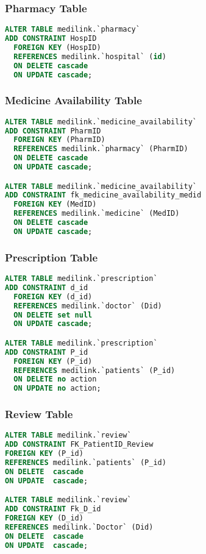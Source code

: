 \documentclass[11pt]{article}
\begin{document}
\subsubsection{Pharmacy Table}
\begin{lstlisting}[language=SQL]
ALTER TABLE medilink.`pharmacy` 
ADD CONSTRAINT HospID
  FOREIGN KEY (HospID)
  REFERENCES medilink.`hospital` (id)
  ON DELETE cascade
  ON UPDATE cascade;
\end{lstlisting}

\subsubsection{Medicine Availability Table}
\begin{lstlisting}[language=SQL]
ALTER TABLE medilink.`medicine_availability` 
ADD CONSTRAINT PharmID
  FOREIGN KEY (PharmID)
  REFERENCES medilink.`pharmacy` (PharmID)
  ON DELETE cascade
  ON UPDATE cascade;

ALTER TABLE medilink.`medicine_availability`
ADD CONSTRAINT fk_medicine_availability_medid
  FOREIGN KEY (MedID)
  REFERENCES medilink.`medicine` (MedID)
  ON DELETE cascade
  ON UPDATE cascade;
\end{lstlisting}

\subsubsection{Prescription Table}
\begin{lstlisting}[language=SQL]
ALTER TABLE medilink.`prescription` 
ADD CONSTRAINT d_id
  FOREIGN KEY (d_id)
  REFERENCES medilink.`doctor` (Did)
  ON DELETE set null
  ON UPDATE cascade;

ALTER TABLE medilink.`prescription` 
ADD CONSTRAINT P_id
  FOREIGN KEY (P_id)
  REFERENCES medilink.`patients` (P_id)
  ON DELETE no action
  ON UPDATE no action;
\end{lstlisting}

\subsubsection{Review Table}
\begin{lstlisting}[language=SQL]
ALTER TABLE medilink.`review`
ADD CONSTRAINT FK_PatientID_Review 
FOREIGN KEY (P_id)
REFERENCES medilink.`patients` (P_id)
ON DELETE  cascade
ON UPDATE  cascade;

ALTER TABLE medilink.`review`
ADD CONSTRAINT Fk_D_id  
FOREIGN KEY (D_id)
REFERENCES medilink.`Doctor` (Did)
ON DELETE  cascade
ON UPDATE  cascade;
\end{lstlisting}
\end{document}
